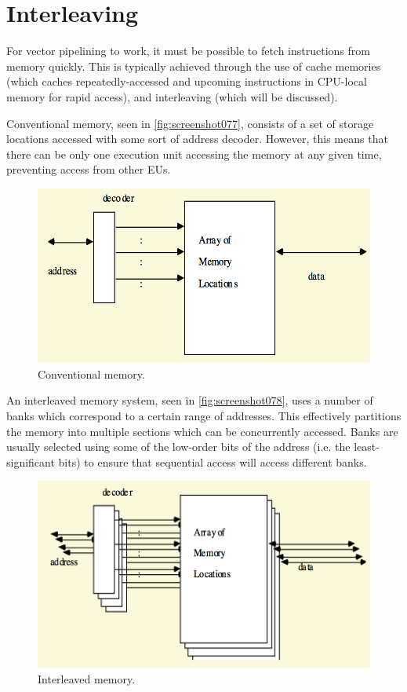 \section{Interleaving}
For vector pipelining to work, it must be possible to fetch instructions from memory quickly. This is typically achieved through the use of cache memories (which caches repeatedly-accessed and upcoming instructions in CPU-local memory for rapid access), and interleaving (which will be discussed).

Conventional memory, seen in \autoref{fig:screenshot077}, consists of a set of storage locations accessed with some sort of address decoder. However, this means that there can be only one execution unit accessing the memory at any given time, preventing access from other EUs.

\begin{figure}
\centering
\includegraphics[width=0.5\linewidth]{screenshot077}
\caption{Conventional memory.}
\label{fig:screenshot077}
\end{figure}

An interleaved memory system, seen in \autoref{fig:screenshot078}, uses a number of banks which correspond to a certain range of addresses. This effectively partitions the memory into multiple sections which can be concurrently accessed. Banks are usually selected using some of the low-order bits of the address (i.e. the least-significant bits) to ensure that sequential access will access different banks.

\begin{figure}
\centering
\includegraphics[width=0.7\linewidth]{screenshot078}
\caption{Interleaved memory.}
\label{fig:screenshot078}
\end{figure}

